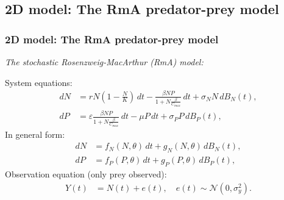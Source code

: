 \subsection{2D model: The RmA predator-prey model}
\begin{frame}
    \frametitle{2D model: The RmA predator-prey model}
    \textit{The stochastic Rosenzweig-MacArthur (RmA) model:}

    \vspace{1cm}
    System equations:
    \begin{subequations}
        \begin{align}
            dN &= rN\left(1-\frac{N}{K}\right)\,dt - \frac{\beta N P}{1+ N \frac{\beta}{C_{max}}} \,dt + \sigma_N N\,dB_N(t), \\
            dP &= \varepsilon  \frac{\beta N P}{1+ N \frac{\beta}{C_{max}}}\,dt - \mu P\,dt + \sigma_P P\,dB_P(t),
        \end{align}
     \end{subequations}
     In general form:
    \begin{subequations}
        \begin{align}
            dN &= f_N(N,\theta)\,dt + g_N(N,\theta)\,dB_N(t), \\
            dP &= f_P(P,\theta)\,dt + g_P(P,\theta)\,dB_P(t),
        \end{align}
    \end{subequations}
    Observation equation (only prey observed):
    \begin{subequations}
        \begin{align}
            Y(t) &= N(t) + e(t), \quad e(t) \sim \mathcal{N}(0, \sigma_{y}^2).
        \end{align}
    \end{subequations}
    

\end{frame}

